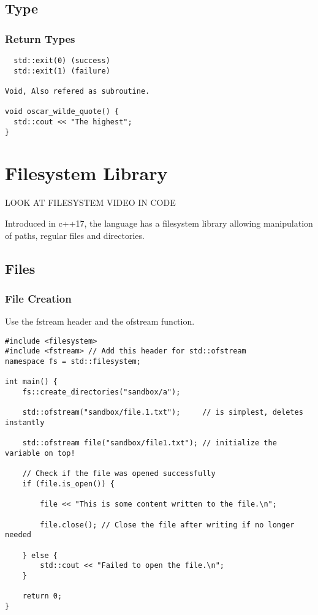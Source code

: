 \section{Type}

\subsection{Return Types}

\begin{verbatim}
  std::exit(0) (success)
  std::exit(1) (failure)

Void, Also refered as subroutine.

void oscar_wilde_quote() {
  std::cout << "The highest";
}
\end{verbatim}

\chapter{Filesystem Library}

LOOK AT FILESYSTEM VIDEO IN CODE

Introduced in c++17, the language has a filesystem library allowing
manipulation of paths, regular files and directories.

\section{Files}

\subsection{File Creation}

Use the fstream header and the ofstream function.

\begin{verbatim}
#include <filesystem>
#include <fstream> // Add this header for std::ofstream
namespace fs = std::filesystem;

int main() {
    fs::create_directories("sandbox/a");

    std::ofstream("sandbox/file.1.txt");     // is simplest, deletes instantly

    std::ofstream file("sandbox/file1.txt"); // initialize the variable on top!

    // Check if the file was opened successfully
    if (file.is_open()) {

        file << "This is some content written to the file.\n";

        file.close(); // Close the file after writing if no longer needed

    } else {
        std::cout << "Failed to open the file.\n";
    }

    return 0;
}
\end{verbatim}


